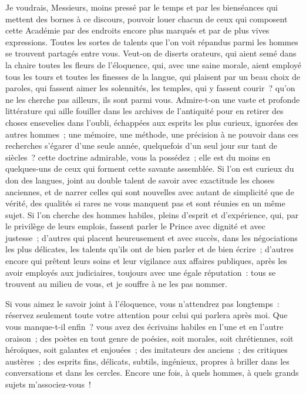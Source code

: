 \documentclass[french,twoside]{book} %
\begin{document}
Je voudrais, Messieurs, moins pressé par le temps et par les bienséances qui mettent des bornes à ce discours, pouvoir louer chacun de ceux qui composent cette Académie par des endroits encore plus marqués et par de plus vives expressions. Toutes les sortes de talents que l’on voit répandus parmi les hommes se trouvent partagés entre vous. Veut-on de diserts orateurs, qui aient semé dans la chaire toutes les fleurs de l’éloquence, qui, avec une saine morale, aient employé tous les tours et toutes les finesses de la langue, qui plaisent par un beau choix de paroles, qui fassent aimer les solennités, les temples, qui y fassent courir ? qu’on ne les cherche pas ailleurs, ils sont parmi vous. Admire-t-on une vaste et profonde littérature qui aille fouiller dans les archives de l’antiquité pour en retirer des choses ensevelies dans l’oubli, échappées aux esprits les plus curieux, ignorées des autres hommes ; une mémoire, une méthode, une précision à ne pouvoir dans ces recherches s’égarer d’une seule année, quelquefois d’un seul jour sur tant de siècles ? cette doctrine admirable, vous la possédez ; elle est du moins en quelques-uns de ceux qui forment cette savante assemblée. Si l’on est curieux du don des langues, joint au double talent de savoir avec exactitude les choses anciennes, et de narrer celles qui sont nouvelles avec autant de simplicité que de vérité, des qualités si rares ne vous manquent pas et sont réunies en un même sujet. Si l’on cherche des hommes habiles, pleins d’esprit et d’expérience, qui, par le privilège de leurs emplois, fassent parler le Prince avec dignité et avec justesse ; d’autres qui placent heureusement et avec succès, dans les négociations les plus délicates, les talents qu’ils ont de bien parler et de bien écrire ; d’autres encore qui prêtent leurs soins et leur vigilance aux affaires publiques, après les avoir employés aux judiciaires, toujours avec une égale réputation : tous se trouvent au milieu de vous, et je souffre à ne les pas nommer.\par
Si vous aimez le savoir joint à l’éloquence, vous n’attendrez pas longtemps : réservez seulement toute votre attention pour celui qui parlera après moi. Que vous manque-t-il enfin ? vous avez des écrivains habiles en l’une et en l’autre oraison ; des poètes en tout genre de poésies, soit morales, soit chrétiennes, soit héroïques, soit galantes et enjouées ; des imitateurs des anciens ; des critiques austères ; des esprits fins, délicats, subtils, ingénieux, propres à briller dans les conversations et dans les cercles. Encore une fois, à quels hommes, à quels grands sujets m’associez-vous !\par
\end{document}
